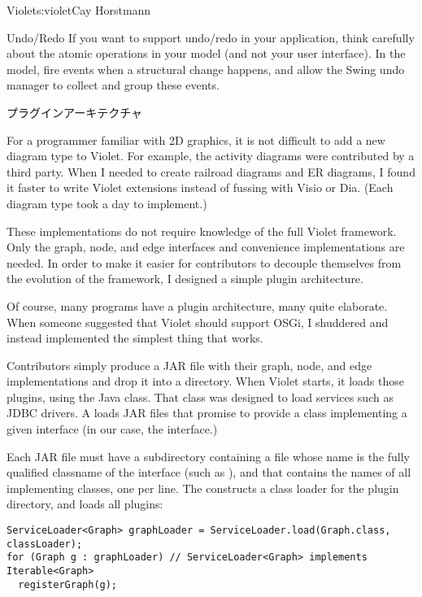 \begin{aosachapter}{Violet}{s:violet}{Cay Horstmann}
\begin{aosasect1}{Undo/Redo}
If you want to support undo/redo in your application, think carefully
about the atomic operations in your model (and not your user
interface).  In the model, fire events when a structural change
happens, and allow the Swing undo manager to collect and group these
events.

\end{aosasect1}

\begin{aosasect1}{プラグインアーキテクチャ}

For a programmer familiar with 2D graphics, it is not difficult to add
a new diagram type to Violet. For example, the activity diagrams were
contributed by a third party. When I needed to create railroad
diagrams and ER diagrams, I found it faster to write Violet extensions
instead of fussing with Visio or Dia. (Each diagram type took a day to
implement.)

These implementations do not require knowledge of the full Violet
framework.  Only the graph, node, and edge interfaces and convenience
implementations are needed. In order to make it easier for
contributors to decouple themselves from the evolution of the
framework, I designed a simple plugin architecture.

Of course, many programs have a plugin architecture, many quite
elaborate.  When someone suggested that Violet should support OSGi, I
shuddered and instead implemented the simplest thing that works.

Contributors simply produce a JAR file with their graph, node, and
edge implementations and drop it into a  directory. When
Violet starts, it loads those plugins, using the Java
 class. That class was designed to load services
such as JDBC drivers. A  loads JAR files that
promise to provide a class implementing a given interface (in our
case, the  interface.)

Each JAR file must have a subdirectory 
containing a file whose name is the fully qualified classname of the
interface (such as ), and that
contains the names of all implementing classes, one per line.
The  constructs a class loader for the plugin
directory, and loads all plugins:

\begin{verbatim}
ServiceLoader<Graph> graphLoader = ServiceLoader.load(Graph.class, classLoader);
for (Graph g : graphLoader) // ServiceLoader<Graph> implements Iterable<Graph>
  registerGraph(g); 
\end{verbatim}


\end{aosasect1}
\end{aosachapter}

